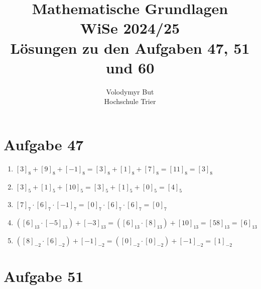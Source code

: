 \documentclass[10pt, oneside]{article}
\title{Mathematische Grundlagen\\[10pt]\Large{WiSe 2024/25}\\[15pt]\Large{L{\"o}sungen zu den Aufgaben 47, 51 und 60}}
\author{Volodymyr But\\[10pt]Hochschule Trier}
\date{}
\begin{document}
\maketitle
\vspace{25px}

\section{Aufgabe 47}
\begin{enumerate}
    \item $[3]_8 + [9]_8 + [-1]_8 = [3]_8 + [1]_8 + [7]_8 = [11]_8 = [3]_8$
    \item $[3]_5 + [1]_5 + [10]_5 = [3]_5 + [1]_5 + [0]_5 = [4]_5$
    \item $[7]_7 \cdot [6]_7 \cdot [-1]_7 = [0]_7 \cdot [6]_7 \cdot [6]_7 = [0]_7$
    \item $([6]_{13} \cdot [-5]_{13}) + [-3]_{13} = ([6]_{13} \cdot [8]_{13}) + [10]_{13} = [58]_{13} = [6]_{13}$
    \item $([8]_{-2} \cdot [6]_{-2}) + [-1]_{-2} = ([0]_{-2} \cdot [0]_{-2}) + [-1]_{-2} = [1]_{-2}$
\end{enumerate}

\section{Aufgabe 51}
\end{document}
